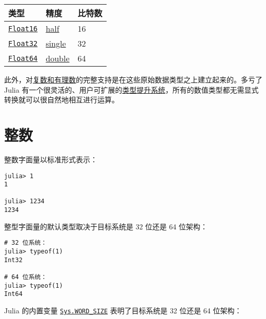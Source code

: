 \begin{table}[h]

\begin{tabulary}{\linewidth}{|L|L|L|}
\hline
类型 & 精度 & 比特数 \\
\hline
\hyperlink{2727296760866702904}{\texttt{Float16}} & \href{https://en.wikipedia.org/wiki/Half-precision\_floating-point\_format}{half} & 16 \\
\hline
\hyperlink{8101639384272933082}{\texttt{Float32}} & \href{https://en.wikipedia.org/wiki/Single\_precision\_floating-point\_format}{single} & 32 \\
\hline
\hyperlink{5027751419500983000}{\texttt{Float64}} & \href{https://en.wikipedia.org/wiki/Double\_precision\_floating-point\_format}{double} & 64 \\
\hline
\end{tabulary}

\end{table}



此外，对\hyperlink{13366825053081777829}{复数和有理数}的完整支持是在这些原始数据类型之上建立起来的。多亏了 Julia 有一个很灵活的、用户可扩展的\hyperlink{10374023657104680331}{类型提升系统}，所有的数值类型都无需显式转换就可以很自然地相互进行运算。



\hypertarget{1329060658000677295}{}


\section{整数}



整数字面量以标准形式表示：




\begin{verbatim}
julia> 1
1

julia> 1234
1234
\end{verbatim}



整型字面量的默认类型取决于目标系统是 32 位还是 64 位架构：




\begin{verbatim}
# 32 位系统：
julia> typeof(1)
Int32

# 64 位系统：
julia> typeof(1)
Int64
\end{verbatim}



Julia 的内置变量 \hyperlink{6553323097149877235}{\texttt{Sys.WORD\_SIZE}} 表明了目标系统是 32 位还是 64 位架构：




